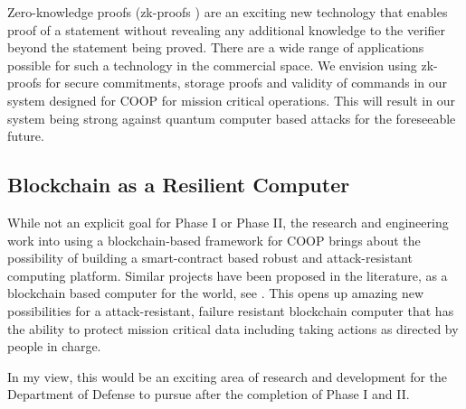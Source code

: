 Zero-knowledge proofs (zk-proofs \cite{bunz2018}) are an exciting new technology that enables proof of a statement without revealing any additional
knowledge to the verifier beyond the statement being proved. There are a wide range of applications possible for such
a technology in the commercial space. We envision using zk-proofs for secure commitments, storage proofs and validity of
commands in our system designed for COOP for mission critical operations. This will result in our system being strong
against quantum computer based attacks for the foreseeable future.

\subsection{Blockchain as a Resilient Computer}

While not an explicit goal for Phase I or Phase II, the research and engineering work into using a blockchain-based
framework for COOP brings about the possibility of building a smart-contract based robust and attack-resistant computing
platform. Similar projects have been proposed in the literature, as a blockchain based computer for the world, see 
\cite{reyes2018, yahya2019, hanke2018}. This opens up amazing new possibilities for a attack-resistant, failure
resistant blockchain computer that has the ability to protect mission critical data including taking actions as directed
by people in charge.

In my view, this would be an exciting area of research and development for the Department of Defense to pursue after the completion
of Phase I and II.

